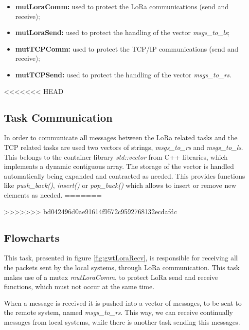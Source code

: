\begin{itemize}
	\item \textbf{mutLoraComm:} used to protect the LoRa communications (send and receive);
	\item \textbf{mutLoraSend:}	used to protect the handling of the vector \textit{msgs\_to\_ls};
	
	\item \textbf{mutTCPComm:} used to protect the TCP/IP communications (send and receive);
	\item \textbf{mutTCPSend:} used to protect the handling of the vector \textit{msgs\_to\_rs}.
\end{itemize}

<<<<<<< HEAD
\subsection{Task Communication}
In order to communicate all messages between the LoRa related tasks and the TCP related tasks are used two vectors of strings, \textit{msgs\_to\_rs} and \textit{msgs\_to\_ls}. This belongs to the container library \textit{std::vector} from C++ libraries, which implements a dynamic contiguous array. The storage of the vector is handled automatically being expanded and contracted as needed. This provides functions like \textit{push\_back()}, \textit{insert()} or \textit{pop\_back()} which allows to insert or remove new elements as needed.
=======

>>>>>>> bd042496d0ae91614f9572c9592768132ecdafdc

\subsection{Flowcharts}
This task, presented in figure \ref{fig:gwtLoraRecv}, is responsible for receiving all the packets sent by the local systems, through LoRa communication. This task makes use of a mutex \textit{mutLoraComm}, to protect LoRa send and receive functions, which must not occur at the same time.

When a message is received it is pushed into a vector of messages, to be sent to the remote system, named \textit{msgs\_to\_rs}. This way, we can receive continually messages from local systems, while there is another task sending this messages.

